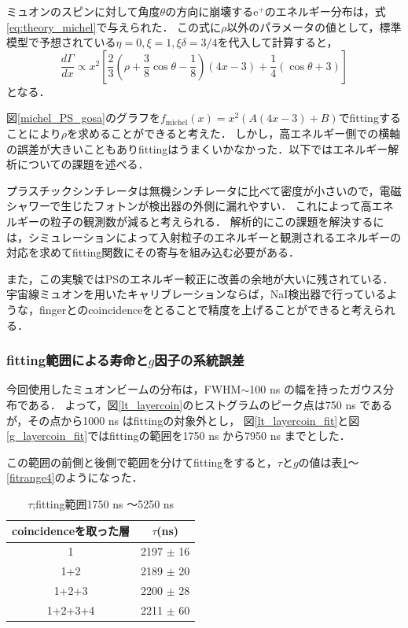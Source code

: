 ミュオンのスピンに対して角度$\theta$の方向に崩壊する$\mathrm{e}^{+}$のエネルギー分布は，式\ref{eq:theory_michel}で与えられた．
この式に$\rho$以外のパラメータの値として，標準模型で予想されている$\eta = 0 , \xi = 1 , \xi \delta = 3/4$を代入して計算すると，
\begin{equation*}
\frac{d\Gamma}{dx} \propto x^{2} [\frac{2}{3}(\rho + \frac{3}{8}\cos \theta - \frac{1}{8})(4x-3) + \frac{1}{4}(\cos \theta + 3)]
\end{equation*}
となる．

図\ref{michel_PS_gosa}のグラフを$f_{\mathrm{michel}}(x) = x^{2} (A(4x -3) + B)$でfittingすることにより$\rho$を求めることができると考えた．
しかし，高エネルギー側での横軸の誤差が大きいこともありfittingはうまくいかなかった．以下ではエネルギー解析についての課題を述べる．

プラスチックシンチレータは無機シンチレータに比べて密度が小さいので，電磁シャワーで生じたフォトンが検出器の外側に漏れやすい．
これによって高エネルギーの粒子の観測数が減ると考えられる．
解析的にこの課題を解決するには，シミュレーションによって入射粒子のエネルギーと観測されるエネルギーの対応を求めてfitting関数にその寄与を組み込む必要がある．

また，この実験ではPSのエネルギー較正に改善の余地が大いに残されている．
宇宙線ミュオンを用いたキャリブレーションならば，NaI検出器で行っているような，fingerとのcoincidenceをとることで精度を上げることができると考えられる．

\subsubsection{fitting範囲による寿命と$g$因子の系統誤差}
今回使用したミュオンビームの分布は，FWHM$\sim$100 ns の幅を持ったガウス分布である．
よって，図\ref{lt_layercoin}のヒストグラムのピーク点は750 ns であるが，その点から1000 ns はfittingの対象外とし，
図\ref{lt_layercoin_fit}と図\ref{g_layercoin_fit}ではfittingの範囲を1750 ns から7950 ns までとした．

この範囲の前側と後側で範囲を分けてfittingをすると，$\tau$と$g$の値は表\ref{fitrange1}〜\ref{fitrange4}のようになった．
\begin{table}[H]
\caption{$\tau$;fitting範囲1750 ns 〜5250 ns}
\label{fitrange1}
\begin{center}
\begin{tabular}{cc}\toprule
coincidenceを取った層 	& $\tau$(ns) \\ \midrule
1 			& 2197 $\pm$ 16 \\
1+2 			& 2189 $\pm$ 20 \\
1+2+3 			& 2200 $\pm$ 28 \\
1+2+3+4 		& 2211 $\pm$ 60 \\ \bottomrule
\end{tabular}
\end{center}
\end{table}%

